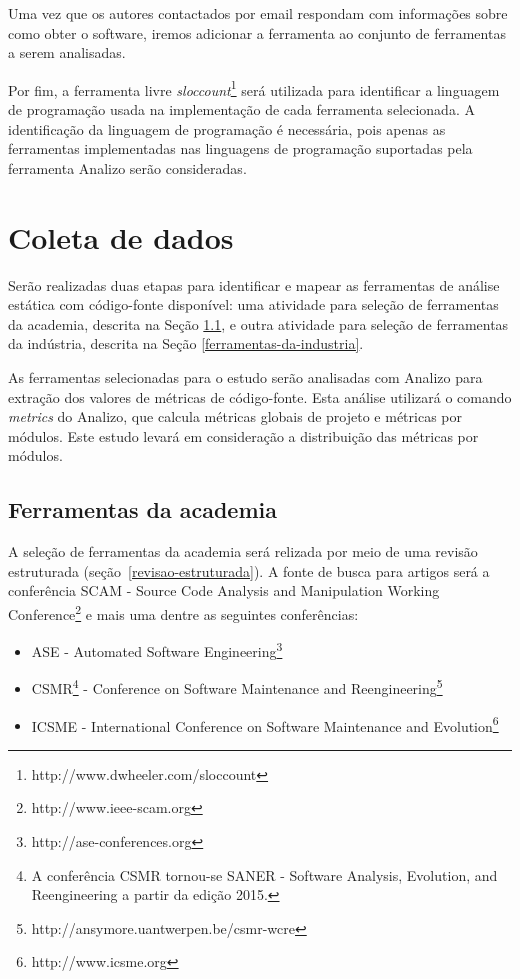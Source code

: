 Uma vez que os autores contactados por email respondam com informações sobre
como obter o software, iremos adicionar a ferramenta ao conjunto de ferramentas
a serem analisadas.

Por fim, a ferramenta livre {\it
sloccount}\footnote{http://www.dwheeler.com/sloccount} será  utilizada para
identificar a linguagem de programação usada na implementação de cada
ferramenta selecionada.  A identificação da linguagem de programação é
necessária, pois apenas as ferramentas implementadas nas linguagens de
programação suportadas pela ferramenta Analizo serão consideradas.

\section{Coleta de dados} \label{coleta}

Serão realizadas duas etapas para identificar e mapear as ferramentas de
análise estática com código-fonte disponível: uma atividade para seleção de
ferramentas da academia, descrita na Seção \ref{ferramentas-da-academia}, e
outra atividade para seleção de ferramentas da indústria, descrita na Seção
\ref{ferramentas-da-industria}.

As ferramentas selecionadas para o estudo serão analisadas com Analizo para
extração dos valores de métricas de código-fonte.  Esta análise utilizará o
comando {\it metrics} do Analizo, que calcula métricas globais de projeto e
métricas por módulos. Este estudo levará em consideração a distribuição das
métricas por módulos.

\subsection{Ferramentas da academia} \label{ferramentas-da-academia}

A seleção de ferramentas da academia será relizada por meio de uma revisão
estruturada (seção~\ref{revisao-estruturada}). A fonte de busca para artigos
será a conferência SCAM - Source Code Analysis and Manipulation Working
Conference\footnote{http://www.ieee-scam.org} e mais uma dentre as seguintes
conferências:

\begin{itemize}
  \item ASE - Automated Software
    Engineering\footnote{http://ase-conferences.org}
  \item CSMR\footnote{A conferência CSMR tornou-se SANER - Software Analysis,
    Evolution, and Reengineering a partir da edição 2015.} - Conference on
    Software Maintenance and
    Reengineering\footnote{http://ansymore.uantwerpen.be/csmr-wcre}
  \item ICSME - International Conference on Software Maintenance and
    Evolution\footnote{http://www.icsme.org}
\end{itemize}

